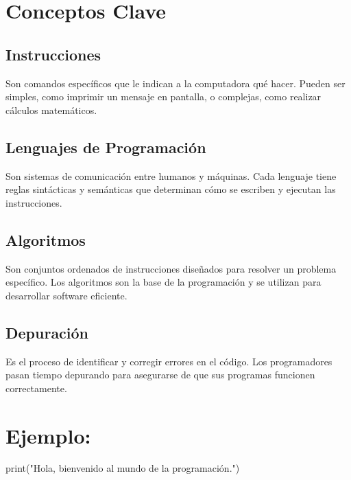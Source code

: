 \documentclass[
  a4paper,
  DIV=11,
  numbers=noendperiod,
  onepage,
  openany]{scrreprt}
\newenvironment{Shaded}{\begin{snugshade}}{\end{snugshade}}
\newcommand{\BuiltInTok}[1]{\textcolor[rgb]{0.00,0.23,0.31}{#1}}
\newcommand{\NormalTok}[1]{\textcolor[rgb]{0.00,0.23,0.31}{#1}}
\newcommand{\StringTok}[1]{\textcolor[rgb]{0.13,0.47,0.30}{#1}}
\newcommand*\circled[1]{\tikz[baseline=(char.base)]{
          \node[shape=circle,draw,inner sep=1pt] (char) {{\scriptsize#1}};}}
\begin{document}
\hypertarget{conceptos-clave-1}{%
\section{Conceptos Clave}\label{conceptos-clave-1}}

\hypertarget{instrucciones-1}{%
\subsection{Instrucciones}\label{instrucciones-1}}

Son comandos específicos que le indican a la computadora qué hacer.
Pueden ser simples, como imprimir un mensaje en pantalla, o complejas,
como realizar cálculos matemáticos.

\hypertarget{lenguajes-de-programaciuxf3n-1}{%
\subsection{Lenguajes de
Programación}\label{lenguajes-de-programaciuxf3n-1}}

Son sistemas de comunicación entre humanos y máquinas. Cada lenguaje
tiene reglas sintácticas y semánticas que determinan cómo se escriben y
ejecutan las instrucciones.

\hypertarget{algoritmos-1}{%
\subsection{Algoritmos}\label{algoritmos-1}}

Son conjuntos ordenados de instrucciones diseñados para resolver un
problema específico. Los algoritmos son la base de la programación y se
utilizan para desarrollar software eficiente.

\hypertarget{depuraciuxf3n-1}{%
\subsection{Depuración}\label{depuraciuxf3n-1}}

Es el proceso de identificar y corregir errores en el código. Los
programadores pasan tiempo depurando para asegurarse de que sus
programas funcionen correctamente.

\hypertarget{ejemplo-1}{%
\section{Ejemplo:}\label{ejemplo-1}}

\hypertarget{annotated-cell-2}{%
\label{annotated-cell-2}}%
\begin{Shaded}
\begin{Highlighting}[]
\BuiltInTok{print}\NormalTok{(}\StringTok{"Hola, bienvenido al mundo de la programación."}\NormalTok{) }\hspace*{\fill}\NormalTok{\circled{1}}
\end{Highlighting}
\end{Shaded}
\end{document}

